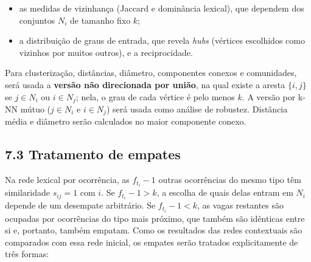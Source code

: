 \documentclass[11pt,a4paper]{article}
\begin{document}
\begin{itemize}
    \item as medidas de vizinhança (Jaccard e dominância lexical), que
    dependem dos conjuntos $N_i$ de tamanho fixo $k$;
    \item a distribuição de graus de entrada, que revela \textit{hubs}
    (vértices escolhidos como vizinhos por muitos outros), e a reciprocidade.
\end{itemize}

Para clusterização, distâncias, diâmetro, componentes conexos e comunidades,
será usada a \textbf{versão não direcionada por união}, na qual existe a
aresta $\{i,j\}$ se $j\in N_i$ ou $i\in N_j$; nela, o grau de cada vértice é
pelo menos $k$. A versão por k-NN mútuo ($j\in N_i$ e $i\in N_j$) será usada
como análise de robustez. Distância média e diâmetro serão calculados no maior
componente conexo.

\subsection*{7.3 Tratamento de empates}

Na rede lexical por ocorrência, as $f_{t_i}-1$ outras ocorrências do mesmo
tipo têm similaridade $s_{ij}=1$ com $i$. Se $f_{t_i}-1>k$, a escolha de quais
delas entram em $N_i$ depende de um desempate arbitrário. Se $f_{t_i}-1<k$, as
vagas restantes são ocupadas por ocorrências do tipo mais próximo, que também
são idênticas entre si e, portanto, também empatam. Como os resultados das
redes contextuais são comparados com essa rede inicial, os empates serão
tratados explicitamente de três formas:
\end{document}
